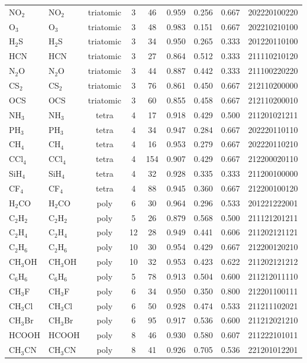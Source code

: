 \documentclass[11pt,twocolumn,a4paper]{article}
\theoremstyle{definition}
\theoremstyle{remark}
\begin{document}
\begin{longtable}{llccccccl}
NO$_2$   & NO$_2$  & triatomic & 3 & 46  & 0.959 & 0.256 & 0.667 & 202220100220 \\
O$_3$    & O$_3$   & triatomic & 3 & 48  & 0.983 & 0.151 & 0.667 & 202210210100 \\
H$_2$S   & H$_2$S  & triatomic & 3 & 34  & 0.950 & 0.265 & 0.333 & 201220110100 \\
HCN      & HCN     & triatomic & 3 & 27  & 0.864 & 0.512 & 0.333 & 211110210120 \\
N$_2$O   & N$_2$O  & triatomic & 3 & 44  & 0.887 & 0.442 & 0.333 & 211100220220 \\
CS$_2$   & CS$_2$  & triatomic & 3 & 76  & 0.861 & 0.450 & 0.667 & 212110200000 \\
OCS      & OCS     & triatomic & 3 & 60  & 0.855 & 0.458 & 0.667 & 212110200010 \\
\midrule
NH$_3$   & NH$_3$  & tetra & 4 & 17  & 0.918 & 0.429 & 0.500 & 211201021211 \\
PH$_3$   & PH$_3$  & tetra & 4 & 34  & 0.947 & 0.284 & 0.667 & 202220110110 \\
CH$_4$   & CH$_4$  & tetra & 4 & 16  & 0.953 & 0.279 & 0.667 & 202220110210 \\
CCl$_4$  & CCl$_4$ & tetra & 4 & 154 & 0.907 & 0.429 & 0.667 & 212200020110 \\
SiH$_4$  & SiH$_4$ & tetra & 4 & 32  & 0.928 & 0.335 & 0.333 & 211200100000 \\
CF$_4$   & CF$_4$  & tetra & 4 & 88  & 0.945 & 0.360 & 0.667 & 212200100120 \\
H$_2$CO  & H$_2$CO & poly  & 6 & 30  & 0.964 & 0.296 & 0.533 & 201221222001 \\
\midrule
C$_2$H$_2$  & C$_2$H$_2$  & poly & 5  & 26  & 0.879 & 0.568 & 0.500 & 211121201211 \\
C$_2$H$_4$  & C$_2$H$_4$  & poly & 12 & 28  & 0.949 & 0.441 & 0.606 & 211202121121 \\
C$_2$H$_6$  & C$_2$H$_6$  & poly & 10 & 30  & 0.954 & 0.429 & 0.667 & 212200120210 \\
CH$_3$OH    & CH$_3$OH    & poly & 10 & 32  & 0.953 & 0.423 & 0.622 & 211202121212 \\
C$_6$H$_6$  & C$_6$H$_6$  & poly & 5  & 78  & 0.913 & 0.504 & 0.600 & 211212011110 \\
CH$_3$F     & CH$_3$F     & poly & 6  & 34  & 0.950 & 0.350 & 0.800 & 212201100111 \\
CH$_3$Cl    & CH$_3$Cl    & poly & 6  & 50  & 0.928 & 0.474 & 0.533 & 211211102021 \\
CH$_3$Br    & CH$_3$Br    & poly & 6  & 95  & 0.917 & 0.536 & 0.600 & 211212021210 \\
HCOOH       & HCOOH       & poly & 8  & 46  & 0.930 & 0.580 & 0.607 & 211222101011 \\
CH$_3$CN    & CH$_3$CN    & poly & 8  & 41  & 0.926 & 0.705 & 0.536 & 221201012201 \\
\end{longtable}
\end{document}
